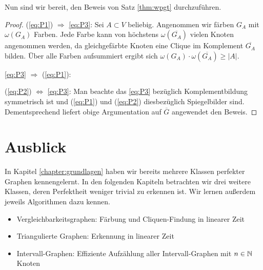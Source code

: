 \documentclass[../main.tex]{subfiles}
\begin{document}
Nun sind wir bereit, den Beweis von Satz \ref{thm:wpgt} durchzuführen.

\begin{proof}
    (\ref{eq:P1}) $\Rightarrow$ \eqref{eq:P3}: Sei $A \subset V$ beliebig. Angenommen wir färben $G_A$ mit $\omega(G_A)$ Farben. Jede Farbe kann von höchstens $\omega(\overline{G_A})$ vielen Knoten angenommen werden, da gleichgefärbte Knoten eine Clique im Komplement $\overline{G_A}$ bilden. Über alle Farben aufsummiert ergibt sich $\omega(G_A) \cdot \omega(\overline{G_A}) \geq |A|$.

    \eqref{eq:P3} $\Rightarrow$ (\ref{eq:P1}): 

    (\ref{eq:P2}) $\Leftrightarrow$ \eqref{eq:P3}: Man beachte das \eqref{eq:P3} bezüglich Komplementbildung symmetrisch ist und (\ref{eq:P1}) und (\ref{eq:P2}) diesbezüglich Spiegelbilder sind. Dementsprechend liefert obige Argumentation auf $\overline G$ angewendet den Beweis.
\end{proof}

\section{Ausblick}

In Kapitel \ref{chapter:grundlagen} haben wir bereits mehrere Klassen perfekter Graphen kennengelernt.
In den folgenden Kapiteln betrachten wir drei weitere Klassen, deren Perfektheit weniger trivial zu erkennen ist. Wir lernen außerdem jeweils Algorithmen dazu kennen.
\begin{itemize}
\item Vergleichbarkeitsgraphen: Färbung und Cliquen-Findung in linearer Zeit
\item Triangulierte Graphen: Erkennung in linearer Zeit
\item Intervall-Graphen: Effiziente Aufzählung aller  Intervall-Graphen mit $n \in \mathbb{N}$ Knoten
\end{itemize}
\end{document}
